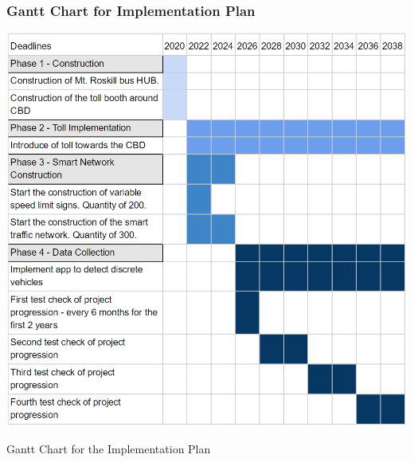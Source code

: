 \documentclass[twoside, a4paper, 11pt]{article}
\begin{document}
\subsubsection{Gantt Chart for Implementation Plan}
\begin{table}[H]
\centering
\includegraphics[width=\textwidth]{GANTT.PNG}
\caption{Gantt Chart for the Implementation Plan}
\label{gantt}
\end{table}
\end{document}
